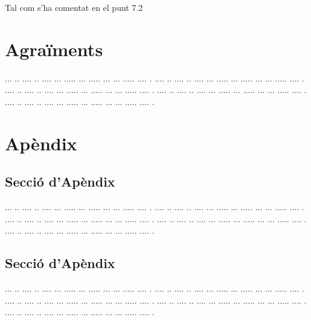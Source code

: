 \documentclass[10pt,a4paper,twocolumn,twoside]{article}
\begin{document}
Tal com s'ha comentat en el punt 7.2

\section*{Agraïments}

... ..  .... .. .... ... ..... ... ..... ... ... ..... .... .
.... ..  .... .. .... ... ..... ... ..... ... ... ..... .... .
.... ..  .... .. .... ... ..... ... ..... ... ... ..... .... .
.... ..  .... .. .... ... ..... ... ..... ... ... ..... .... .
.... ..  .... .. .... ... ..... ... ..... ... ... ..... .... .






\appendix

\section*{Apèndix}

\setcounter{section}{1}

\subsection{Secció d'Apèndix}


... ..  .... .. .... ... ..... ... ..... ... ... ..... .... .
.... ..  .... .. .... ... ..... ... ..... ... ... ..... .... .
.... ..  .... .. .... ... ..... ... ..... ... ... ..... .... .
.... ..  .... .. .... ... ..... ... ..... ... ... ..... .... .
.... ..  .... .. .... ... ..... ... ..... ... ... ..... .... .

\subsection{Secció d'Apèndix}


... ..  .... .. .... ... ..... ... ..... ... ... ..... .... .
.... ..  .... .. .... ... ..... ... ..... ... ... ..... .... .
.... ..  .... .. .... ... ..... ... ..... ... ... ..... .... .
.... ..  .... .. .... ... ..... ... ..... ... ... ..... .... .
.... ..  .... .. .... ... ..... ... ..... ... ... ..... .... .
\end{document}
